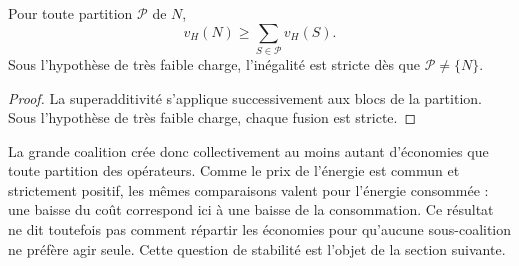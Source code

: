 \begin{corollaire}
\label{cor:efficacite_grande_coalition}
Pour toute partition \(\mathcal P\) de \(N\),
\[
    v_H(N)\geqslant\sum_{S\in\mathcal P}v_H(S).
\]
Sous l'hypothèse de très faible charge, l'inégalité est stricte dès que
\(\mathcal P\neq\{N\}\).
\end{corollaire}

\begin{proof}
La superadditivité s'applique successivement aux blocs de la partition. Sous
l'hypothèse de très faible charge, chaque fusion est stricte.
\end{proof}

La grande coalition crée donc collectivement au moins autant d'économies que
toute partition des opérateurs. Comme le prix de l'énergie est commun et
strictement positif, les mêmes comparaisons valent pour l'énergie consommée :
une baisse du coût correspond ici à une baisse de la consommation. Ce résultat
ne dit toutefois pas comment répartir les économies pour qu'aucune
sous-coalition ne préfère agir seule. Cette question de stabilité est l'objet
de la section suivante.
